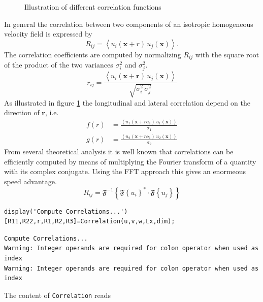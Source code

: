 \documentclass[preprint,12pt,ntfdMod]{elsarticle}
\begin{document}
\begin{par}
\begin{figure}[t!]
{        \label{fig:trans_corr}
        }
\caption{Illustration of different correlation functions}
\label{fig:correlations}
\end{figure}
In general the correlation between two components of an isotropic
homogeneous velocity field is expressed by
  \begin{equation}
      R_{ij} = \left<u_i(\mathbf{x}+r)\,u_j(\mathbf{x})\right>.
  \end{equation}
The correlation coefficients are computed by normalizing
$R_{ij}$ with the square root of the product of the two variances
$\sigma_i^2$ and $\sigma_j^2$.
  \begin{equation}
      r_{ij} = \frac{\left<u_i(\mathbf{x}+\mathbf{r})\,u_j(\mathbf{x})\right>}
                  {\sqrt{\sigma_i^2\,\sigma_j^2}}
  \end{equation}
As illustrated in figure \ref{fig:correlations} the longitudinal and lateral
correlation depend on the direction of $\mathbf{r}$, i.e.
  \begin{eqnarray}
      f(r) &= \displaystyle\frac{\left<u_1(\mathbf{x}+r\mathbf{e}_1)\,u_1(\mathbf{x})\right>}
                  {\sigma_1}\\
      g(r) &= \displaystyle\frac{\left<u_2(\mathbf{x}+r\mathbf{e}_1)\,u_2(\mathbf{x})\right>}
                  {\sigma_2}
  \end{eqnarray}
From several theoretical analysis it is well known that correlations can
be efficiently computed by means of multiplying the Fourier transform of
a quantity with its complex conjugate. Using the FFT approach this gives
an enormeous speed advantage.
  \begin{equation}
      R_{ij} =
      \mathfrak{F}^{-1}\left\{\mathfrak{F}\left\{u_i\right\}^*\cdot\mathfrak{F}\left\{u_j\right\}\right\}
  \end{equation}

\end{par} \vspace{1em}
\begin{verbatim}
display('Compute Correlations...')
[R11,R22,r,R1,R2,R3]=Correlation(u,v,w,Lx,dim);
\end{verbatim}

        \color{lightgray} \begin{verbatim}Compute Correlations...
Warning: Integer operands are required for colon operator when used as
index 
Warning: Integer operands are required for colon operator when used as
index 
\end{verbatim} \color{black}
    \begin{par}

The content of \verb|Correlation| reads


\end{par} \vspace{1em}
\begin{par}




\end{par} \vspace{1em}
\end{document}
